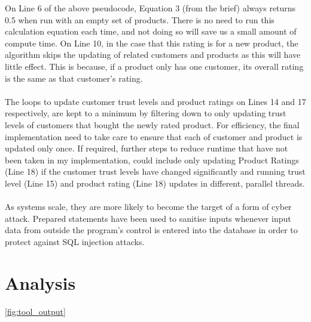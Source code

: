 \documentclass{article}
\begin{document}
On Line 6 of the above pseudocode, Equation 3 (from the brief) always returns 0.5 when run with an empty set of products. There is no need to run this calculation equation each time, and not doing so will save us a small amount of compute time. On Line 10, in the case that this rating is for a new product, the algorithm skips the updating of related customers and products as this will have little effect. This is because, if a product only has one customer, its overall rating is the same as that customer's rating.
\\\\
The loops to update customer trust levels and product ratings on Lines 14 and 17 respectively, are kept to a minimum by filtering down to only updating trust levels of customers that bought the newly rated product. For efficiency, the final implementation need to take care to ensure that each of customer and product is updated only once. If required, further steps to reduce runtime that have not been taken in my implementation, could include only updating Product Ratings (Line 18) if the customer trust levels have changed significantly and running trust level (Line 15) and product rating (Line 18) updates in different, parallel threads.
\\\\
As systems scale, they are more likely to become the target of a form of cyber attack. Prepared statements have been used to sanitise inputs whenever input data from outside the program's control is entered into the database in order to protect against SQL injection attacks.

\section{Analysis} %

\ref{fig:tool_output}



\end{document}
